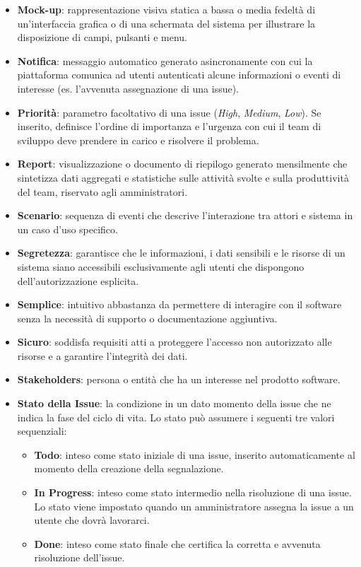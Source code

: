 \documentclass[a4paper,12pt]{article}
\begin{document}
\begin{itemize}
    \item \textbf{Mock-up}: rappresentazione visiva statica a bassa o media fedeltà di un'interfaccia grafica o di una schermata del sistema per illustrare la disposizione di campi, pulsanti e menu.

    \item \textbf{Notifica}: messaggio automatico generato asincronamente con cui la piattaforma comunica ad utenti autenticati alcune informazioni o eventi di interesse (es. l'avvenuta assegnazione di una issue).

    \item \textbf{Priorità}: parametro facoltativo di una issue (\textit{High}, \textit{Medium}, \textit{Low}). Se inserito, definisce l'ordine di importanza e l'urgenza con cui il team di sviluppo deve prendere in carico e risolvere il problema. 

    \item \textbf{Report}: visualizzazione o documento di riepilogo generato mensilmente che sintetizza dati aggregati e statistiche sulle attività svolte e sulla produttività del team, riservato agli amministratori.

    \item \textbf{Scenario}: sequenza di eventi che descrive l'interazione tra attori e sistema in un caso d'uso specifico.

    \item \textbf{Segretezza}: garantisce che le informazioni, i dati sensibili e le risorse di un sistema siano accessibili esclusivamente agli utenti che dispongono dell'autorizzazione esplicita.

    \item \textbf{Semplice}: intuitivo abbastanza da permettere di interagire con il software senza la necessità di supporto o documentazione aggiuntiva.

    \item \textbf{Sicuro}: soddisfa requisiti atti a proteggere l'accesso non autorizzato alle risorse e a garantire l'integrità dei dati.

    \item \textbf{Stakeholders}: persona o entità che ha un interesse nel prodotto software.

    \item \textbf{Stato della Issue}: la condizione in un dato momento della issue che ne indica la fase del ciclo di vita. Lo stato può assumere i seguenti tre valori sequenziali:
    \begin{itemize}
        \item \textbf{Todo}: inteso come stato iniziale di una issue, inserito automaticamente al momento della creazione della segnalazione.
        \item \textbf{In Progress}: inteso come stato intermedio nella risoluzione di una issue. Lo stato viene impostato quando un amministratore assegna la issue a un utente che dovrà lavorarci.
        \item \textbf{Done}: inteso come stato finale che certifica la corretta e avvenuta risoluzione dell'issue.
    \end{itemize}


\end{itemize}
\end{document}
